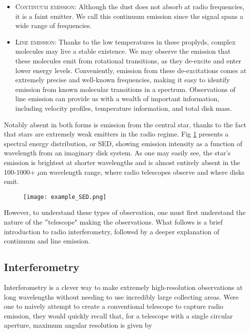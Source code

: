 \begin{itemize}
  \item \textsc{Continuum emission}: Although the dust does not absorb at radio frequencies, it is a faint emitter. We call this continuum emission since the signal spans a wide range of frequencies.

  \item \textsc{Line emission}: Thanks to the low temperatures in these proplyds, complex molecules may live a stable existence. We may observe the emission that these molecules emit from rotational transitions, as they de-excite and enter lower energy levels. Conveniently, emission from these de-excitations comes at extremely precise and well-known frequencies, making it easy to identify emission from known molecular transitions in a spectrum. Observations of line emission can provide us with a wealth of important information, including velocity profiles, temperature information, and total disk mass.
\end{itemize}

Notably absent in both forms is emission from the central star, thanks to the fact that stars are extremely weak emitters in the radio regime. Fig \ref{fig:SED} presents a spectral energy distribution, or SED, showing emission intensity as a function of wavelength from an imaginary disk system. As one may easily see, the star's emission is brightest at shorter wavelengths and is almost entirely absent in the 100-1000+ $\mu$m wavelength range, where radio telescopes observe and where disks emit.

\begin{figure}
\centering
  \texttt{[image: example\_SED.png]}
  \label{fig:SED}
\end{figure}

However, to understand these types of observation, one must first understand the nature of the $''$telescope" making the observations. What follows is a brief introduction to radio interferometry, followed by a deeper explanation of continuum and line emission.



\subsection{Interferometry}
\label{section: interferometry}
Interferometry is a clever way to make extremely high-resolution observations at long wavelengths without needing to use incredibly large collecting areas. Were one to naively attempt to create a conventional telescope to capture radio emission, they would quickly recall that, for a telescope with a single circular aperture, maximum angular resolution is given by

